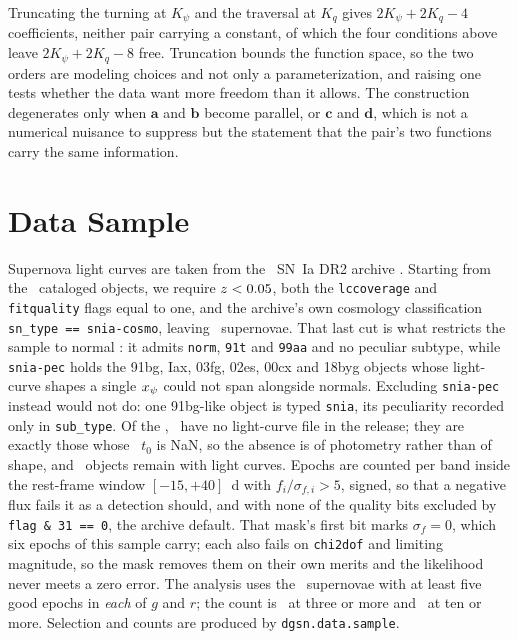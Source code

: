 \documentclass[11pt]{article}
\theoremstyle{plain}
\begin{document}
Truncating the turning at $K_{\psi}$ and the traversal at $K_{q}$ gives
$2K_{\psi} + 2K_{q} - 4$ coefficients, neither pair carrying a constant, of which the four
conditions above leave $2K_{\psi} + 2K_{q} - 8$ free. Truncation bounds the function space,
so the two orders are modeling choices and not only a parameterization, and raising one
tests whether the data want more freedom than it allows. The construction degenerates only
when $\mathbf{a}$ and $\mathbf{b}$ become parallel, or $\mathbf{c}$ and $\mathbf{d}$, which is not a numerical nuisance to
suppress but the statement that the pair's two functions carry the same information.

\section{Data Sample}
\label{sec:samples}

Supernova light curves are taken from  the \ztf\ SN~Ia DR2 archive
\citep{Rigault2025}. Starting from the \Ncatalogued\ cataloged objects, we require
$z < 0.05$, both the \texttt{lccoverage} and \texttt{fitquality} flags equal to one,
and the archive's own cosmology classification \texttt{sn\_type == snia-cosmo}, leaving
\Nselected\ supernovae. That last cut is what restricts the sample to normal \sneia: it admits
\texttt{norm}, \texttt{91t} and \texttt{99aa} and no peculiar subtype, while
\texttt{snia-pec} holds the 91bg, Iax, 03fg, 02es, 00cx and 18byg objects whose light-curve
shapes a single $x_{\psi}$ could not span alongside normals. Excluding
\texttt{snia-pec} instead would not do: one 91bg-like object is typed \texttt{snia}, its
peculiarity recorded only in \texttt{sub\_type}. Of the \Nselected, \Nnolc\ have no light-curve
file in the release; they are exactly those whose \salt\ $t_{0}$ is NaN, so the
absence is of photometry rather than of shape, and \Nphot\ objects remain with light curves. Epochs are counted per
band inside the rest-frame window $[-15,+40]$~d with $f_{i}/\sigma_{f,i} > 5$, signed, so
that a negative flux fails it as a detection should, and with
none of the quality bits excluded by \texttt{flag \& 31 == 0}, the archive default. That
mask's first bit marks $\sigma_{f} = 0$, which six epochs of this sample carry; each also
fails on \texttt{chi2dof} and limiting magnitude, so the mask removes them on their own
merits and the likelihood never meets a zero error. 
The analysis uses the \Nanalysis\ supernovae with at least five good epochs in \emph{each} of $g$
and $r$; the count is \Nthree\ at three or more and \Nten\ at ten or more.
Selection and counts are produced by \texttt{dgsn.data.sample}.
\end{document}

